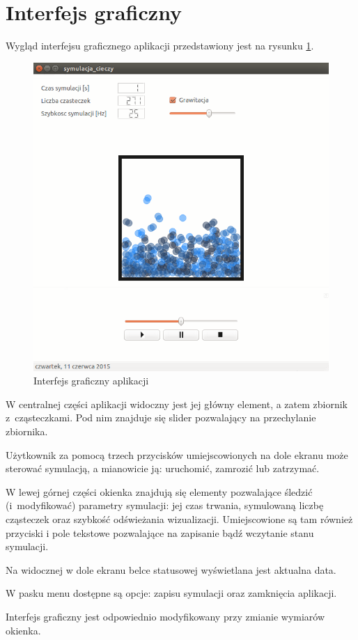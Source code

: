 
\section{Interfejs graficzny}
Wygląd interfejsu graficznego aplikacji przedstawiony jest na rysunku \ref{fig:gui}.

\begin{figure}
 \begin{center} 
  \includegraphics[width=\textwidth]{./rysunki/gui} 
 \end{center}
 \caption{Interfejs graficzny aplikacji}
 \label{fig:gui} 
\end{figure}

W centralnej części aplikacji widoczny jest jej główny element, a zatem zbiornik z~cząsteczkami. Pod nim znajduje się slider pozwalający na przechylanie zbiornika.

Użytkownik za pomocą trzech przycisków umiejscowionych na dole ekranu może sterować symulacją, a mianowicie ją: uruchomić, zamrozić lub zatrzymać.  

W lewej górnej części okienka znajdują się elementy pozwalające śledzić (i~modyfikować) parametry symulacji: jej czas trwania, symulowaną liczbę cząsteczek oraz szybkość odświeżania wizualizacji. Umiejscowione są tam również przyciski i pole tekstowe pozwalające na zapisanie bądź wczytanie stanu symulacji.

Na widocznej w dole ekranu belce statusowej wyświetlana jest aktualna data.

W pasku menu dostępne są opcje: zapisu symulacji oraz zamknięcia aplikacji.

Interfejs graficzny jest odpowiednio modyfikowany przy zmianie wymiarów okienka.